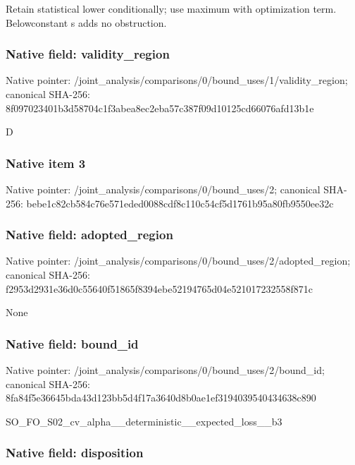 \documentclass[10pt,a4paper]{article}
\begin{document}
Retain statistical lower conditionally; use maximum with optimization term. Belowconstant s adds no obstruction.


\subsubsection{Native field: validity\_region}


Native pointer: /joint\_analysis/comparis\allowbreak{}ons/0/bound\_uses/1/valid\allowbreak{}ity\_region; canonical SHA-256: 8f097023401b3d58704c1f3a\allowbreak{}bea8ec2eba57c387f09d1012\allowbreak{}5cd66076afd13b1e


D


\subsubsection{Native item 3}


Native pointer: /joint\_analysis/comparis\allowbreak{}ons/0/bound\_uses/2; canonical SHA-256: bebe1c82cb584c76e571eded\allowbreak{}0088cdf8c110c54cf5d1761b\allowbreak{}95a80fb9550ee32c



\subsubsection{Native field: adopted\_region}


Native pointer: /joint\_analysis/comparis\allowbreak{}ons/0/bound\_uses/2/adopt\allowbreak{}ed\_region; canonical SHA-256: f2953d2931e36d0c55640f51\allowbreak{}865f8394ebe52194765d04e5\allowbreak{}21017232558f871c


None


\subsubsection{Native field: bound\_id}


Native pointer: /joint\_analysis/comparis\allowbreak{}ons/0/bound\_uses/2/bound\allowbreak{}\_id; canonical SHA-256: 8fa84f5e36645bda43d123bb\allowbreak{}5d4f17a3640d8b0ae1ef3194\allowbreak{}039540434638c890


SO\_FO\_S02\_cv\_alpha\_\_dete\allowbreak{}rministic\_\_expected\_loss\allowbreak{}\_\_b3


\subsubsection{Native field: disposition}
\end{document}
